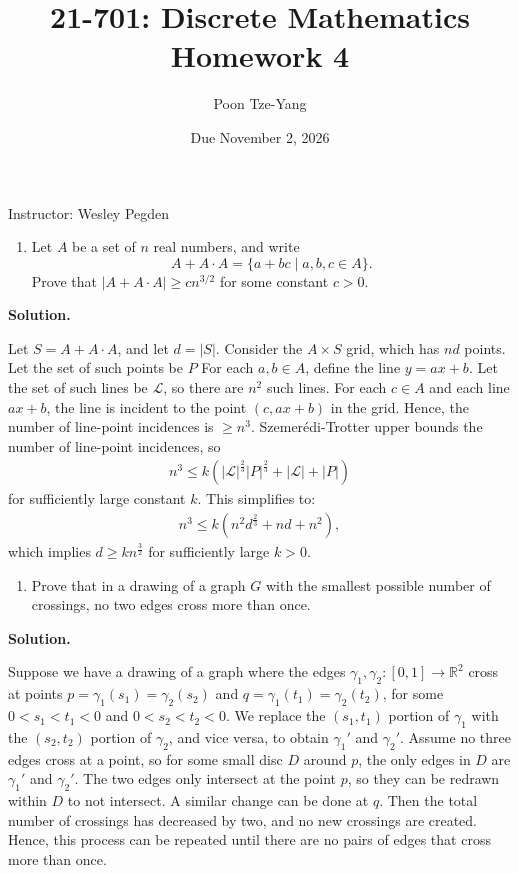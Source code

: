 \documentclass[11pt,letterpaper]{article}
\title{21-701: Discrete Mathematics \\ Homework 4}
\author{Poon Tze-Yang}
\date{Due November 2, 2026}
\theoremstyle{definition}
\newcommand{\reals}{\mathbb{R}}
\newcommand{\calL}{\mathcal{L}}
\newcommand{\solution}{\medskip\noindent\textbf{Solution.}\par\medskip}
\begin{document}
\maketitle

\noindent Instructor: Wesley Pegden

\begin{enumerate}[series=q]
\item Let $A$ be a set of $n$ real numbers, and write
\[
A + A \cdot A = \{a + bc \mid a, b, c \in A\}.
\]
Prove that $|A + A \cdot A| \geq cn^{3/2}$ for some constant $c > 0$.
\end{enumerate}

\solution

Let $S=A+A\cdot A$, and let $d=|S|$. 
Consider the $A\times S$ grid, which has $nd$ points.
Let the set of such points be $P$
For each $a,b\in A$, define the line $y = ax+b$.
Let the set of such lines be $\calL$, so there are $n^2$ such lines.
For each $c\in A$ and each line $ax+b$, the line is incident to the point $(c,ax+b)$ in the grid.
Hence, the number of line-point incidences is $\geq n^3$.
Szemer\'edi-Trotter upper bounds the number of line-point incidences, so
\begin{align*}
    n^3\leq k(|\calL|^\frac{2}{3}|P|^\frac{2}{3}+|\calL|+|P|)
\end{align*}
for sufficiently large constant $k$.
This simplifies to:
\begin{align*}
    n^3\leq k(n^2d^\frac{2}{3} + nd + n^2),
\end{align*}
which implies $d\geq kn^\frac{3}{2}$ for sufficiently large $k>0$.


\begin{enumerate}[resume=q]
\item Prove that in a drawing of a graph $G$ with the smallest possible number of crossings, no two edges cross more than once.
\end{enumerate}

\solution

Suppose we have a drawing of a graph where the edges $\gamma_1,\gamma_2: [0,1]\to \reals^2$ cross at points $p=\gamma_1(s_1) = \gamma_2(s_2)$ and $q=\gamma_1(t_1) = \gamma_2(t_2)$, for some $0<s_1<t_1<0$ and $0<s_2<t_2<0$.
We replace the $(s_1,t_1)$ portion of $\gamma_1$ with the $(s_2,t_2)$ portion of $\gamma_2$, and vice versa, to obtain $\gamma_1'$ and $\gamma_2'$.
Assume no three edges cross at a point, so for some small disc $D$ around $p$, the only edges in $D$ are $\gamma_1'$ and $\gamma_2'$.
The two edges only intersect at the point $p$, so they can be redrawn within $D$ to not intersect.
A similar change can be done at $q$.
Then the total number of crossings has decreased by two, and no new crossings are created.
Hence, this process can be repeated until there are no pairs of edges that cross more than once.
\end{document}
